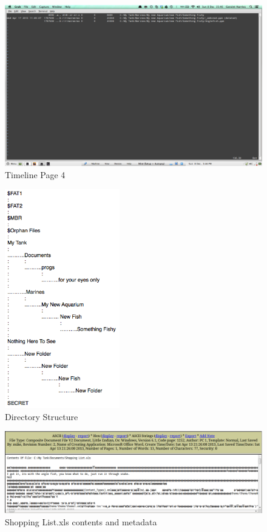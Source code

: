 \documentclass[12pt]{article}
\begin{document}
				\begin{figure}[ht!]
					\centering
					\includegraphics[width=12cm]{Images/TimeLine4.png}
					\caption{Timeline Page 4}
				\end{figure}

				\begin{figure}[ht!]
					\centering
					\includegraphics[width=5cm]{Images/DirectoryStructure.png}
					\caption{Directory Structure}
				\end{figure}
			
				\begin{figure}[ht!]
					\centering
					\includegraphics[width=\textwidth]{Images/WordExcel.png}
					\caption{Shopping List.xls contents and metadata}
				\end{figure}
\end{document}
